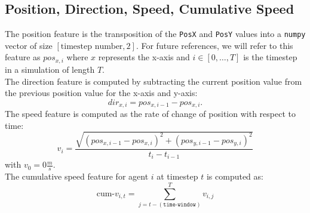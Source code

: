 \documentclass[../../Thesis.tex]{subfiles}
\begin{document}
		\subsection{Position, Direction, Speed, Cumulative Speed}
			The position feature is the transposition of the \verb|PosX| and \verb|PosY| values into a \verb|numpy| vector of size $[\text{timestep number}, 2]$. For future references, we will refer to this feature as $pos_{x,i}$ where $x$ represents the x-axis and $i \in [0, \dots, T]$ is the timestep in a simulation of length $T$.\\
			The direction feature is computed by subtracting the current position value from the previous position value for the x-axis and y-axis:
			\[dir_{x,i} = pos_{x,i-1} - pos_{x,i}.\]
			The speed feature is computed as the rate of change of position with respect to time:
			\begin{equation}
				v_i = 
				\frac{\sqrt{(pos_{x,i-1} - pos_{x,i})^2 + (pos_{y,i-1} - pos_{y,i})^2}}
					{t_{i} - t_{i-1}}
				\label{eq:speed_computation}
			\end{equation}
			with $v_0 = 0 \frac{m}{s}$.\\
			The cumulative speed feature for agent $i$ at timestep $t$ is computed as:
			\[\text{cum-}v_{i,t} = 
					\sum\limits_{j=t-(\texttt{time-window})}^T v_{i,j}
			\]
		
\end{document}
